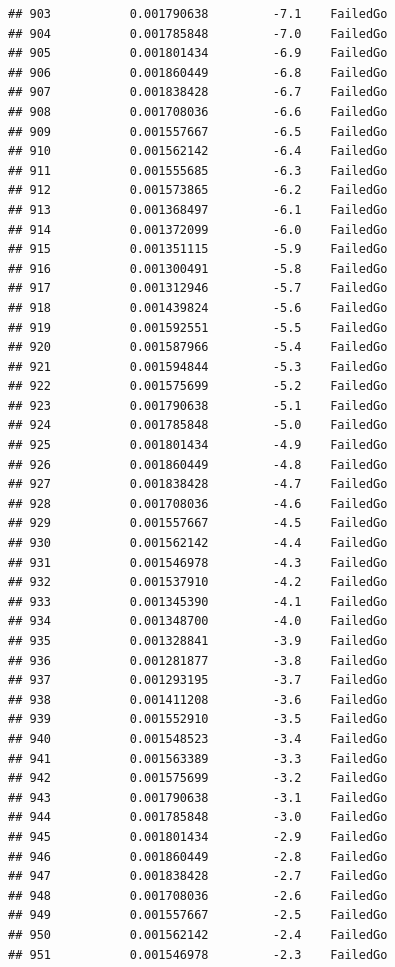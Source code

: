 \documentclass[
]{article}
\begin{document}
\begin{verbatim}
## 903           0.001790638         -7.1    FailedGo
## 904           0.001785848         -7.0    FailedGo
## 905           0.001801434         -6.9    FailedGo
## 906           0.001860449         -6.8    FailedGo
## 907           0.001838428         -6.7    FailedGo
## 908           0.001708036         -6.6    FailedGo
## 909           0.001557667         -6.5    FailedGo
## 910           0.001562142         -6.4    FailedGo
## 911           0.001555685         -6.3    FailedGo
## 912           0.001573865         -6.2    FailedGo
## 913           0.001368497         -6.1    FailedGo
## 914           0.001372099         -6.0    FailedGo
## 915           0.001351115         -5.9    FailedGo
## 916           0.001300491         -5.8    FailedGo
## 917           0.001312946         -5.7    FailedGo
## 918           0.001439824         -5.6    FailedGo
## 919           0.001592551         -5.5    FailedGo
## 920           0.001587966         -5.4    FailedGo
## 921           0.001594844         -5.3    FailedGo
## 922           0.001575699         -5.2    FailedGo
## 923           0.001790638         -5.1    FailedGo
## 924           0.001785848         -5.0    FailedGo
## 925           0.001801434         -4.9    FailedGo
## 926           0.001860449         -4.8    FailedGo
## 927           0.001838428         -4.7    FailedGo
## 928           0.001708036         -4.6    FailedGo
## 929           0.001557667         -4.5    FailedGo
## 930           0.001562142         -4.4    FailedGo
## 931           0.001546978         -4.3    FailedGo
## 932           0.001537910         -4.2    FailedGo
## 933           0.001345390         -4.1    FailedGo
## 934           0.001348700         -4.0    FailedGo
## 935           0.001328841         -3.9    FailedGo
## 936           0.001281877         -3.8    FailedGo
## 937           0.001293195         -3.7    FailedGo
## 938           0.001411208         -3.6    FailedGo
## 939           0.001552910         -3.5    FailedGo
## 940           0.001548523         -3.4    FailedGo
## 941           0.001563389         -3.3    FailedGo
## 942           0.001575699         -3.2    FailedGo
## 943           0.001790638         -3.1    FailedGo
## 944           0.001785848         -3.0    FailedGo
## 945           0.001801434         -2.9    FailedGo
## 946           0.001860449         -2.8    FailedGo
## 947           0.001838428         -2.7    FailedGo
## 948           0.001708036         -2.6    FailedGo
## 949           0.001557667         -2.5    FailedGo
## 950           0.001562142         -2.4    FailedGo
## 951           0.001546978         -2.3    FailedGo

\end{verbatim}
\end{document}
